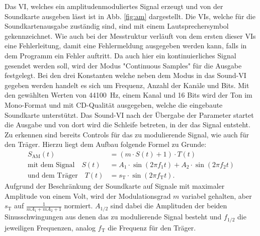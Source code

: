 Das VI, welches ein amplitudenmoduliertes Signal erzeugt und von der Soundkarte ausgeben lässt ist in Abb. \ref{fig:am} dargestellt.
Die VIs, welche für die Soundkartenausgabe zuständig sind, sind mit einem Lautsprechersymbol gekennzeichnet. 
Wie auch bei der Messtruktur verläuft von dem ersten dieser VIs eine Fehlerleitung, damit eine Fehlermeldung ausgegeben werden kann, falls in dem Programm ein Fehler auftritt.
Da auch hier ein kontinuierliches Signal gesendet werden soll, wird der Modus "Continuous Samples" für die Ausgabe festgelegt.
Bei den drei Konstanten welche neben dem Modus in das Sound-VI gegeben werden handelt es sich um Frequenz, Anzahl der Kanäle und Bits.
Mit den gewählten Werten von \SI{44100}{\hertz}, einem Kanal und 16 Bits wird der Ton im Mono-Format und mit CD-Qualität ausgegeben, welche die eingebaute Soundkarte unterstützt.
Das Sound-VI nach der Übergabe der Parameter startet die Ausgabe und von dort wird die Schleife betreten, in der das Signal entsteht.
Zu erkennen sind bereits Controls für das zu modulierende Signal, wie auch für den Träger.
Hierzu liegt dem Aufbau folgende Formel zu Grunde:
\begin{align}
	\label{eq:AM1} S_\text{AM}(t) &= (m \cdot S(t) + 1) \cdot T(t) \\
	\label{eq:AM2} \text{mit dem Signal} \quad S(t) &= A_1 \cdot \sin{(2\pi f_1 t)} + A_2 \cdot \sin{(2\pi f_2 t)}\\
	\label{eq:AM3} \text{und dem Träger} \quad T(t) &= s_\text{T} \cdot \sin{(2\pi f_\text{T} t)}.
\end{align} 
Aufgrund der Beschränkung der Soundkarte auf Signale mit maximaler Amplitude von einem Volt, wird der Modulationsgrad $m$ variabel gehalten, aber $s_\text{T}$ auf $\frac{1}{mA_1 + mA_2 + 1}$ normiert. 
$A_{1/2}$ sind dabei die Amplituden der beiden Sinusschwingungen aus denen das zu modulierende Signal besteht und $f_{1/2}$ die jeweiligen Frequenzen, analog $f_\text{T}$ die Frequenz für den Träger.

